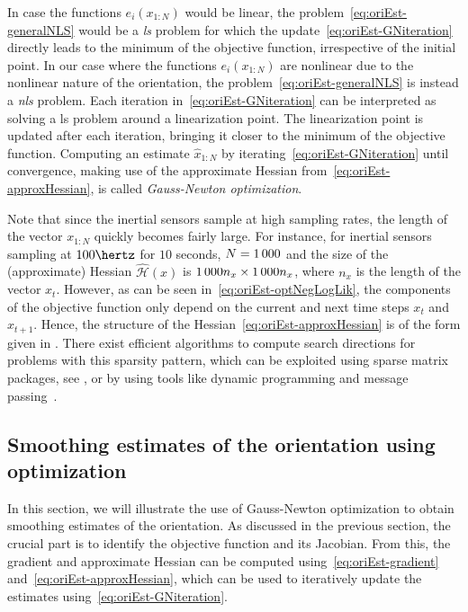 In case the functions $e_i(x_{1:N})$ would be linear, the problem~\eqref{eq:oriEst-generalNLS} would be a \emph{\gls{ls}} problem for which the update~\eqref{eq:oriEst-GNiteration} directly leads to the minimum of the objective function, irrespective of the initial point. In our case where the functions $e_i(x_{1:N})$ are nonlinear due to the nonlinear nature of the orientation, the problem~\eqref{eq:oriEst-generalNLS} is instead a \emph{\gls{nls}} problem. Each iteration in~\eqref{eq:oriEst-GNiteration} can be interpreted as solving a \gls{ls} problem around a linearization point. The linearization point is updated after each iteration, bringing it closer to the minimum of the objective function. Computing an estimate $\hat x_{1:N}$ by iterating~\eqref{eq:oriEst-GNiteration} until convergence, making use of the approximate Hessian from~\eqref{eq:oriEst-approxHessian}, is called \emph{Gauss-Newton optimization}.

Note that since the inertial sensors sample at high sampling rates, the length of the vector $x_{1:N}$ quickly becomes fairly large. For instance, for inertial sensors sampling at $100\hertz$ for $10$ seconds, $N = 1 \thinspace 000$ and the size of the (approximate) Hessian $\mathcal{\hat{H}}(x)$ is $1 \thinspace 000 n_x \times 1 \thinspace 000 n_x$, where $n_x$ is the length of the vector $x_t$. However, as can be seen in~\eqref{eq:oriEst-optNegLogLik}, the components of the objective function only depend on the current and next time steps $x_t$ and $x_{t+1}$. Hence, the structure of the Hessian~\eqref{eq:oriEst-approxHessian} is of the form given in . There exist efficient algorithms to compute search directions for problems with this sparsity pattern, which can be exploited using sparse matrix packages, see \eg \cite{davis:2006}, or by using tools like dynamic programming and message passing~\citep{bertsekas:1995,golubvL:2013,saad:2003}.

\subsection{Smoothing estimates of the orientation using optimization}
In this section, we will illustrate the use of Gauss-Newton optimization to obtain smoothing estimates of the orientation. As discussed in the previous section, the crucial part is to identify the objective function and its Jacobian. From this, the gradient and approximate Hessian can be computed using~\eqref{eq:oriEst-gradient} and~\eqref{eq:oriEst-approxHessian}, which can be used to iteratively update the estimates using~\eqref{eq:oriEst-GNiteration}. 

